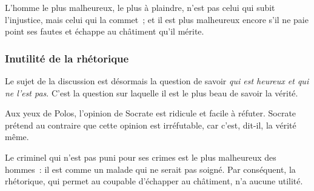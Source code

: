 \documentclass[fontsize=26pt,a4paper]{scrartcl}
\begin{document}
L'homme le plus malheureux, le plus à plaindre, n'est pas celui qui subit l'injustice, mais celui qui la commet~; et il est plus malheureux encore s'il ne paie point ses fautes et échappe au châtiment qu'il mérite.%

\subsubsection*{Inutilité de la rhétorique}

Le sujet de la discussion est désormais la question de savoir \emph{qui est heureux et qui ne l'est pas}. C'est la question sur laquelle il est le plus beau de savoir la vérité.

Aux yeux de Polos, l'opinion de Socrate est ridicule et facile à réfuter. Socrate prétend au contraire que cette opinion est irréfutable, car c'est, dit-il, la vérité même.%


Le criminel qui n'est pas puni pour ses crimes est le plus malheureux des hommes~: il est comme un malade qui ne serait pas soigné. Par conséquent, la rhétorique, qui permet au coupable d'échapper au châtiment, n'a aucune utilité.%
\end{document}
